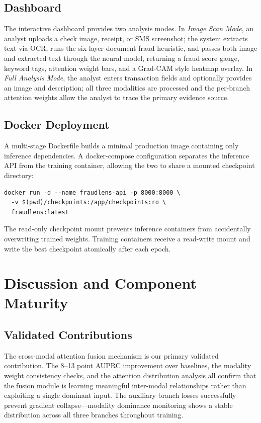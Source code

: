 \documentclass[10pt,conference,letterpaper]{IEEEtran}
\begin{document}
\subsection{Dashboard}

The interactive dashboard provides two analysis modes. In \textit{Image Scan Mode}, an
analyst uploads a check image, receipt, or SMS screenshot; the system extracts text via
OCR, runs the six-layer document fraud heuristic, and passes both image and extracted
text through the neural model, returning a fraud score gauge, keyword tags, attention
weight bars, and a Grad-CAM style heatmap overlay. In \textit{Full Analysis Mode}, the
analyst enters transaction fields and optionally provides an image and description; all
three modalities are processed and the per-branch attention weights allow the analyst to
trace the primary evidence source.

\subsection{Docker Deployment}

A multi-stage Dockerfile builds a minimal production image containing only inference
dependencies. A docker-compose configuration separates the inference API from the
training container, allowing the two to share a mounted checkpoint directory:

\begin{lstlisting}[basicstyle=\small\ttfamily, breaklines=true]
docker run -d --name fraudlens-api -p 8000:8000 \
  -v $(pwd)/checkpoints:/app/checkpoints:ro \
  fraudlens:latest
\end{lstlisting}

The read-only checkpoint mount prevents inference containers from accidentally
overwriting trained weights. Training containers receive a read-write mount and
write the best checkpoint atomically after each epoch.

\section{Discussion and Component Maturity}

\subsection{Validated Contributions}

The cross-modal attention fusion mechanism is our primary validated contribution. The
8--13 point AUPRC improvement over baselines, the modality weight consistency checks,
and the attention distribution analysis all confirm that the fusion module is learning
meaningful inter-modal relationships rather than exploiting a single dominant input.
The auxiliary branch losses successfully prevent gradient collapse---modality dominance
monitoring shows a stable distribution across all three branches throughout training.
\end{document}
